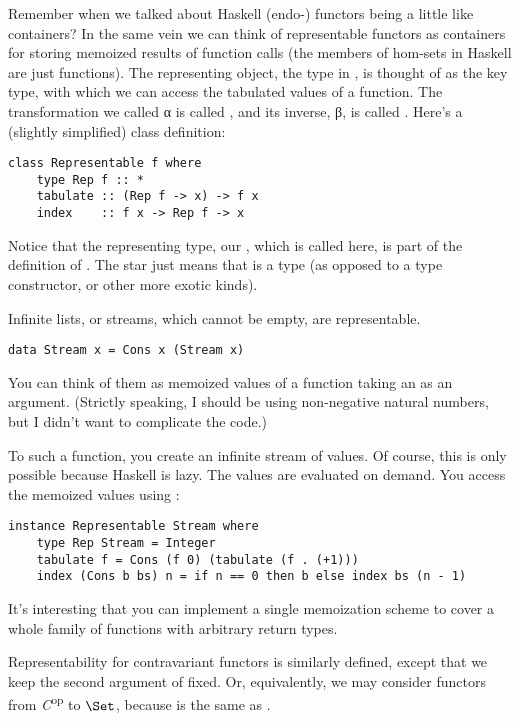 Remember when we talked about Haskell (endo-) functors being a little
like containers? In the same vein we can think of representable functors
as containers for storing memoized results of function calls (the
members of hom-sets in Haskell are just functions). The representing
object, the type  in , is thought of as the
key type, with which we can access the tabulated values of a function.
The transformation we called α is called , and its
inverse, β, is called . Here's a (slightly simplified)
 class definition:

\begin{Verbatim}[commandchars=\\\{\}]
class Representable f where
    type Rep f :: *
    tabulate :: (Rep f -> x) -> f x
    index    :: f x -> Rep f -> x
\end{Verbatim}
Notice that the representing type, our , which is called
 here, is part of the definition of
. The star just means that  is a
type (as opposed to a type constructor, or other more exotic kinds).

Infinite lists, or streams, which cannot be empty, are representable.

\begin{Verbatim}[commandchars=\\\{\}]
data Stream x = Cons x (Stream x)
\end{Verbatim}
You can think of them as memoized values of a function taking an
 as an argument. (Strictly speaking, I should be using
non-negative natural numbers, but I didn't want to complicate the code.)

To  such a function, you create an infinite stream of
values. Of course, this is only possible because Haskell is lazy. The
values are evaluated on demand. You access the memoized values using
:

\begin{Verbatim}[commandchars=\\\{\}]
instance Representable Stream where
    type Rep Stream = Integer
    tabulate f = Cons (f 0) (tabulate (f . (+1)))
    index (Cons b bs) n = if n == 0 then b else index bs (n - 1)
\end{Verbatim}
It's interesting that you can implement a single memoization scheme to
cover a whole family of functions with arbitrary return types.

Representability for contravariant functors is similarly defined, except
that we keep the second argument of  fixed. Or,
equivalently, we may consider functors from \emph{C}\textsuperscript{op}
to $\Set$, because  is the same as
.


